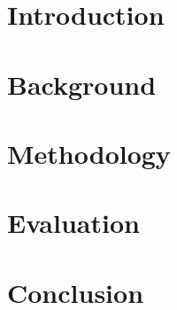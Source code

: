 \documentclass[12pt]{report}
\title{}
\author{}
\date{April 2023}
\begin{document}

\newpage

\newpage

\newpage



\tableofcontents

\listoffigures

\listoftables



\chapter{Introduction}
\setcounter{page}{1}

\label{sec:Introduction}
\newpage

\chapter{Background}
\label{sec:Background}

\newpage

\chapter{Methodology}
\newpage
\label{sec:Methodology}

\newpage

\chapter{Evaluation}
\newpage
\label{sec:Evaluation}

\newpage

\chapter{Conclusion}
\newpage
\label{sec:Conclusion}

\newpage


\printbibliography[heading=bibintoc]
\end{document}
